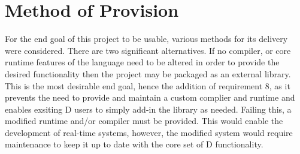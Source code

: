 \section{Method of Provision}
For the end goal of this project to be usable, various methods for its delivery 
were considered. There are two significant alternatives. If no compiler, or 
core runtime features of the language need to be altered in order to provide the 
desired functionality then the project may be packaged as an external library. 
This is the most desirable end goal, hence the addition of requirement 8, as it 
prevents the need to provide and maintain a custom complier and runtime and enables 
exsiting D users to simply add-in the library as needed. 
Failing this, a modified runtime and/or compiler must be provided. This would 
enable the development of real-time systems, however, the modified system would 
require maintenance to keep it up to date with the core set of D functionality. 

